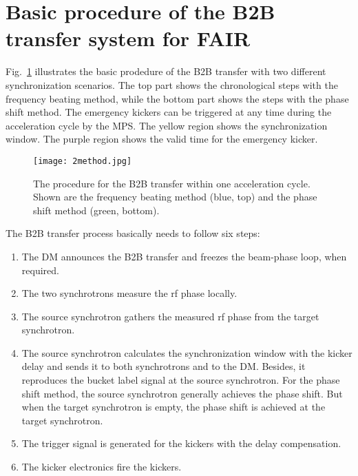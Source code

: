\section{Basic procedure of the B2B transfer system for FAIR}

Fig.~\ref{2method} illustrates the basic prodedure of the B2B transfer with two different synchronization scenarios. The top part shows the chronological steps with the frequency beating method, while the bottom part shows the steps with the phase shift method. The emergency kickers can be triggered at any time during the acceleration cycle by the MPS. The yellow region shows the synchronization window. The purple region shows the valid time for the emergency kicker. 
\begin{figure}[H]
   \centering   
   \texttt{[image: 2method.jpg]}
   \caption{The procedure for the B2B transfer within one acceleration cycle. Shown are the frequency beating method (blue, top) and the phase shift method (green, bottom).}
   \label{2method}
\end{figure}

The B2B transfer process basically needs to follow six steps:
\begin{enumerate}
\item The DM announces the B2B transfer and freezes the beam-phase loop, when required.
\item The two synchrotrons measure the rf phase locally.
\item The source synchrotron gathers the measured rf phase from the target synchrotron.
\item The source synchrotron calculates the synchronization window with the kicker delay and sends it to both synchrotrons and to the DM. Besides, it reproduces the bucket label signal at the source synchrotron.
For the phase shift method, the source synchrotron generally achieves the phase shift. But when the target synchrotron is empty, the phase shift is achieved at the target synchrotron.
\item The trigger signal is generated for the kickers with the delay compensation.
\item The kicker electronics fire the kickers.
\end{enumerate}

